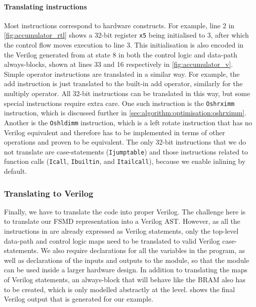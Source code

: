 \paragraph{Translating instructions}

Most \rtl{} instructions correspond to hardware constructs.
For example, line 2 in \cref{fig:accumulator_rtl} shows a 32-bit register
\texttt{x5} being initialised to 3, after which the control flow moves execution
to line 3. This initialisation is also encoded in the Verilog generated from \htl{}
at state 8 in both the control logic and data-path always-blocks, shown at lines
33 and 16 respectively in \cref{fig:accumulator_v}.  Simple operator
instructions are translated in a similar way.  For example, the add instruction
is just translated to the built-in add operator, similarly for the multiply
operator.  All 32-bit instructions can be translated in this way, but some
special instructions require extra care. One such instruction is the
\texttt{Oshrximm} instruction, which is discussed further in
\cref{sec:algorithm:optimisation:oshrximm}. Another is the
\texttt{Oshldimm} instruction, which is a left rotate instruction that has no
Verilog equivalent and therefore has to be implemented in terms of other
operations and proven to be equivalent.
The only 32-bit instructions that we do not translate are case-statements
(\texttt{Ijumptable}) and those instructions related to function calls
(\texttt{Icall}, \texttt{Ibuiltin}, and \texttt{Itailcall}), because we enable
inlining by default.

\subsubsection{Translating \htl{} to Verilog}

Finally, we have to translate the \htl{} code into proper
Verilog. %
The challenge here is to translate our FSMD representation into a Verilog AST.
However, as all the instructions in \htl{} are already expressed as Verilog
statements, only the top-level data-path and control logic maps need to be
translated to valid Verilog case-statements.  We also require declarations for
all the variables in the program, as well as declarations of the inputs and
outputs to the module, so that the module can be used inside a larger hardware
design.  In addition to translating the maps of Verilog statements, an
always-block that will behave like the \gls{BRAM} also has to be created, which
is only modelled abstractly at the \htl{} level.   shows
the final Verilog output that is generated for our example.

